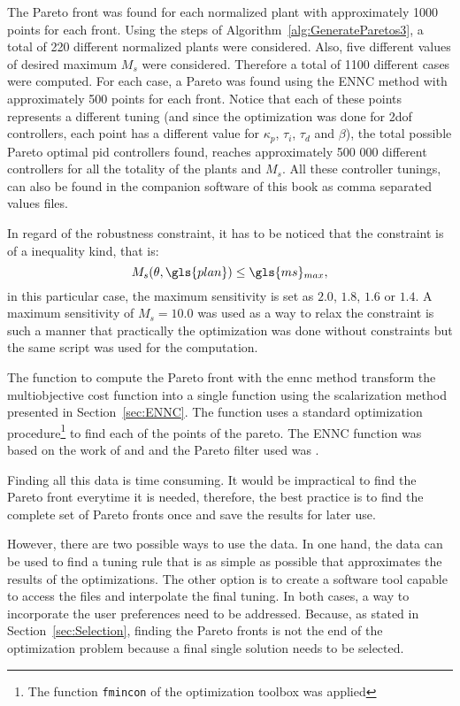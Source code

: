 The Pareto front was found for each normalized plant with approximately 1000 points for each front. Using the steps of Algorithm~\ref{alg:GenerateParetos3}, a total of 220 different normalized plants were considered. Also, five different values of desired maximum $M_s$ were considered. Therefore a total of 1100 different cases were computed. For each case, a Pareto was found using the ENNC method with approximately 500 points for each front. Notice that each of these points represents a different tuning (and since the optimization was done for \gls{2dof} controllers, each point has a different value for $\kappa_p$, $\tau_i$, $\tau_d$ and $\beta$), the total possible Pareto optimal \gls{pid} controllers found, reaches approximately 500 000 different controllers for all the totality of the plants and $M_s$. All these controller tunings, can also be found in the companion software of this book as comma separated values files.

In regard of the robustness constraint, it has to be noticed that the constraint is of a inequality kind, that is:
\begin{equation*}
	M_s(\theta, \gls{plan}) \leq \gls{ms}\mbox{}_{max},
\end{equation*} 
in this particular case, the maximum sensitivity is set as $2.0$, $1.8$, $1.6$ or $1.4$. A maximum sensitivity of $M_s = 10.0$ was used as a way to relax the constraint is such a manner that practically the optimization was done without constraints but the same script was used for the computation.

The function to compute the Pareto front with the \gls{ennc} method transform the multiobjective cost function into a single function using the scalarization method presented in Section~\ref{sec:ENNC}. The function uses a standard optimization procedure\footnote{The function \texttt{fmincon} of the \matlab{} optimization toolbox was applied} to find each of the points of the pareto. The ENNC function was based on the work of \cite{Houska2011} and \cite{Logist2012} and the Pareto filter used was \cite{Cao2020}.

Finding all this data is time consuming. It would be impractical to find the Pareto front everytime it is needed, therefore, the best practice is to find the complete set of Pareto fronts once and save the results for later use.

However, there are two possible ways to use the data. In one hand, the data can be used to find a tuning rule that is as simple as possible that approximates the results of the optimizations. The other option is to create a software tool capable to access the files and interpolate the final tuning. In both cases, a way to incorporate the user preferences need to be addressed. Because, as stated in Section~\ref{sec:Selection}, finding the Pareto fronts is not the end of the optimization problem because a final single solution needs to be selected.

